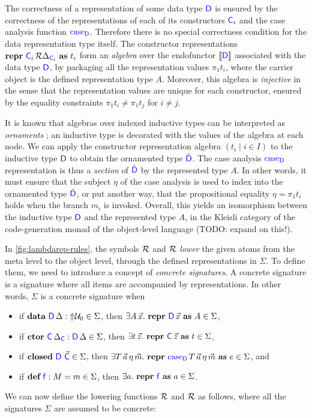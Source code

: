 The correctness of a representation of some data type ${\color{blue}{\mathsf{D}}}$ is ensured by
the correctness of the representations of each of its constructors ${\color{blue}{\mathsf{C}}}_i$
and the case analysis function ${\color{blue}{\mathsf{\textrm{case}_{D}}}}$. Therefore there is no special
correctness condition for the data representation type itself. The constructor
representations $\textbf{repr} \ {{\color{blue}{\mathsf{C}}}_i}\, {\mathcal{R} {\Delta_{{\color{blue}{\mathsf{C}}}_i}}}\ \textbf{as}\ {t_i}$ form an
\emph{algebra} over the endofunctor $\llbracket {\ensuremath{\color{blue}{\mathsf{D}}}} \rrbracket$ associated
with the data type ${\color{blue}{\mathsf{D}}}$, by packaging all the representation values $\pi_1
  t_i$, where the carrier object is the defined representation type $A$.
Moreover, this algebra is \emph{injective} in the sense that the representation
values are unique for each constructor, ensured by the equality constraints
$\pi_1 t_i \neq \pi_1 t_j$ for $i \neq j$.

It is known that algebras over indexed inductive types can be interpreted as
\emph{ornaments} \cite{Dagand2017-nj}; an inductive type is decorated with the
values of the algebra at each node. We can apply the constructor representation
algebra $(t_i \mid i \in I)$ to the inductive type ${\color{blue}{\mathsf{D}}}$ to obtain the
ornamented type $\tilde{{\color{blue}{\mathsf{D}}}}$. The case analysis ${\color{blue}{\mathsf{\textrm{case}_{D}}}}$
representation is thus a \emph{section} of $\tilde{{\color{blue}{\mathsf{D}}}}$ by the represented
type $A$. In other words, it must ensure that the subject $\eta$ of the case
analysis is used to index into the ornamented type $\tilde{{\color{blue}{\mathsf{D}}}}$, or put
another way, that the propositional equality $\eta = \pi_1 t_i$ holds when the
branch $m_i$ is invoked. Overall, this yields an isomorphism between the
inductive type ${\color{blue}{\mathsf{D}}}$ and the represented type $A$, in the Kleisli category
of the code-generation monad of the object-level language (TODO: expand on
this!).

In \cref{fig:lambdarep-rules}, the symbols $\mathcal{R} {}$ and $\mathcal{R} {}$
\emph{lower} the given atoms from the meta level to the object level, through
the defined representations in $\Sigma$. To define them, we need to introduce a
concept of \emph{concrete signatures}. A concrete signature is a signature
where all items are accompanied by representations. In other words, $\Sigma$ is
a concrete signature when
\begin{itemize}
  \item if $\textbf{data} \ {\color{blue}{\mathsf{D}}} \, {\Delta} : \text{$\Uparrow$}{\mathcal{U}_0} \in \Sigma$, then $\exists A \, \vec{x} .\
          \textbf{repr} \ {\color{blue}{\mathsf{D}}}\, {\vec{x}}\ \textbf{as}\ {A} \in \Sigma$,
  \item if $\textbf{ctor} \ {\color{blue}{\mathsf{C}}} \, {\Delta_{{\color{blue}{\mathsf{C}}}}} : {\color{blue}{\mathsf{D}}}\, {\Delta} \in \Sigma$, then $\exists
          t\,\vec{z} .\ \textbf{repr} \ {{\color{blue}{\mathsf{C}}}}\, {\vec{z}}\ \textbf{as}\ {t} \in \Sigma$,
  \item if $\textbf{closed}\ {\color{blue}{\mathsf{D}}} \ \vec{{\color{blue}{\mathsf{C}}}} \in \Sigma$, then $\exists
          T\,\vec{a}\,\eta\,\vec{m} .\ \Srepr{\caselab{D}}{T\,\vec{a}\,\eta\,\vec{m} }{e}
          \in \Sigma$, and
  \item if $\textbf{def} \ {\color{blue}{\mathsf{f}}} : {M} = {m} \in \Sigma$, then $\exists a .\ \textbf{repr} \ {\color{blue}{\mathsf{f}}}\ \textbf{as}\ {a} \in
          \Sigma$.
\end{itemize}
We can now define the lowering functions $\mathcal{R} {}$ and $\mathcal{R} {}$ as follows, where
all the signatures $\Sigma$ are assumed to be concrete:

